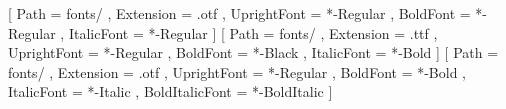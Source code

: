 [
  Path           = fonts/ ,
  Extension      = .otf ,
  UprightFont    = *-Regular ,
  BoldFont       = *-Regular ,
  ItalicFont     = *-Regular ]
\setsansfont{Montserrat}[
  Path           = fonts/ ,
  Extension      = .ttf ,
  UprightFont    = *-Regular ,
  BoldFont       = *-Black ,
  ItalicFont     = *-Bold ]
\setmonofont{FantasqueSansMono}[
  Path           = fonts/ ,
  Extension      = .otf ,
  UprightFont    = *-Regular ,
  BoldFont       = *-Bold ,
  ItalicFont     = *-Italic ,
  BoldItalicFont = *-BoldItalic ]
\renewcommand{\familydefault}{\sfdefault} %
